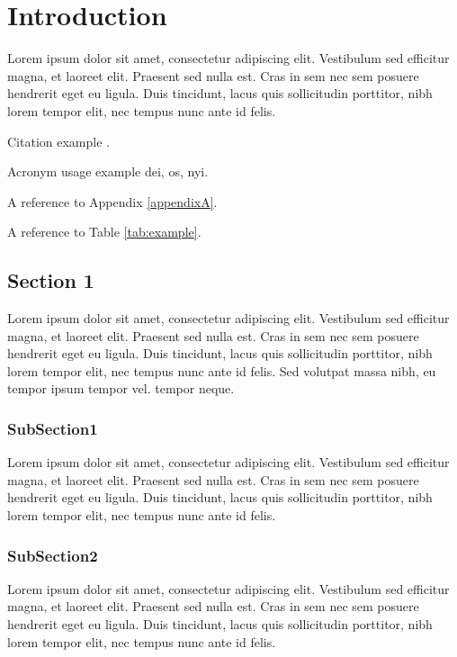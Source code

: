 \chapter{Introduction}
\label{sec:introduction}

Lorem ipsum dolor sit amet, consectetur adipiscing elit. Vestibulum sed efficitur magna, et laoreet elit. Praesent sed nulla est. Cras in sem nec sem posuere hendrerit eget eu ligula. Duis tincidunt, lacus quis sollicitudin porttitor, nibh lorem tempor elit, nec tempus nunc ante id felis.

Citation example \cite{oppenheimer_why_2003}.

Acronym usage example \gls{dei}, \gls{os}, \gls{nyi}.

A reference to Appendix \ref{appendixA}.

A reference to Table \ref{tab:example}.



\section{Section 1}
\label{subsec:sec1}

Lorem ipsum dolor sit amet, consectetur adipiscing elit. Vestibulum sed efficitur magna, et laoreet elit. Praesent sed nulla est. Cras in sem nec sem posuere hendrerit eget eu ligula. Duis tincidunt, lacus quis sollicitudin porttitor, nibh lorem tempor elit, nec tempus nunc ante id felis. Sed volutpat massa nibh, eu tempor ipsum tempor vel. tempor neque.

\subsection{SubSection1}

Lorem ipsum dolor sit amet, consectetur adipiscing elit. Vestibulum sed efficitur magna, et laoreet elit. Praesent sed nulla est. Cras in sem nec sem posuere hendrerit eget eu ligula. Duis tincidunt, lacus quis sollicitudin porttitor, nibh lorem tempor elit, nec tempus nunc ante id felis.

\subsection{SubSection2}

Lorem ipsum dolor sit amet, consectetur adipiscing elit. Vestibulum sed efficitur magna, et laoreet elit. Praesent sed nulla est. Cras in sem nec sem posuere hendrerit eget eu ligula. Duis tincidunt, lacus quis sollicitudin porttitor, nibh lorem tempor elit, nec tempus nunc ante id felis.

